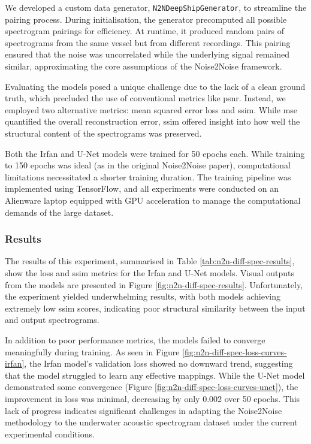 We developed a custom data generator, \texttt{N2NDeepShipGenerator}, to streamline the pairing process. During initialisation, the generator precomputed all possible spectrogram pairings for efficiency. At runtime, it produced random pairs of spectrograms from the same vessel but from different recordings. This pairing ensured that the noise was uncorrelated while the underlying signal remained similar, approximating the core assumptions of the Noise2Noise framework.

Evaluating the models posed a unique challenge due to the lack of a clean ground truth, which precluded the use of conventional metrics like \acrshort{psnr}. Instead, we employed two alternative metrics: mean squared error loss and \acrshort{ssim}. While \acrshort{mse} quantified the overall reconstruction error, \acrshort{ssim} offered insight into how well the structural content of the spectrograms was preserved.

Both the Irfan and U-Net models were trained for 50 epochs each. While training to 150 epochs was ideal (as in the original Noise2Noise paper), computational limitations necessitated a shorter training duration. The training pipeline was implemented using TensorFlow, and all experiments were conducted on an Alienware laptop equipped with GPU acceleration to manage the computational demands of the large dataset.

\subsubsection{Results}

The results of this experiment, summarised in Table \ref{tab:n2n-diff-spec-results}, show the loss and \acrshort{ssim} metrics for the Irfan and U-Net models. Visual outputs from the models are presented in Figure \ref{fig:n2n-diff-spec-results}. Unfortunately, the experiment yielded underwhelming results, with both models achieving extremely low \acrshort{ssim} scores, indicating poor structural similarity between the input and output spectrograms.

In addition to poor performance metrics, the models failed to converge meaningfully during training. As seen in Figure \ref{fig:n2n-diff-spec-loss-curves-irfan}, the Irfan model's validation loss showed no downward trend, suggesting that the model struggled to learn any effective mappings. While the U-Net model demonstrated some convergence (Figure \ref{fig:n2n-diff-spec-loss-curves-unet}), the improvement in loss was minimal, decreasing by only 0.002 over 50 epochs. This lack of progress indicates significant challenges in adapting the Noise2Noise methodology to the underwater acoustic spectrogram dataset under the current experimental conditions.

